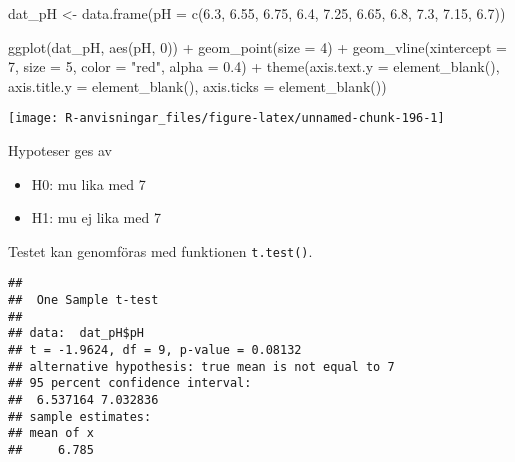 \documentclass[
]{book}
\newenvironment{Shaded}{\begin{snugshade}}{\end{snugshade}}
\newcommand{\AttributeTok}[1]{\textcolor[rgb]{0.77,0.63,0.00}{#1}}
\newcommand{\DecValTok}[1]{\textcolor[rgb]{0.00,0.00,0.81}{#1}}
\newcommand{\FloatTok}[1]{\textcolor[rgb]{0.00,0.00,0.81}{#1}}
\newcommand{\FunctionTok}[1]{\textcolor[rgb]{0.00,0.00,0.00}{#1}}
\newcommand{\NormalTok}[1]{#1}
\newcommand{\OtherTok}[1]{\textcolor[rgb]{0.56,0.35,0.01}{#1}}
\newcommand{\SpecialCharTok}[1]{\textcolor[rgb]{0.00,0.00,0.00}{#1}}
\newcommand{\StringTok}[1]{\textcolor[rgb]{0.31,0.60,0.02}{#1}}
\providecommand{\tightlist}{%
  \setlength{\itemsep}{0pt}\setlength{\parskip}{0pt}}
\theoremstyle{definition}
\theoremstyle{definition}
\theoremstyle{definition}
\theoremstyle{definition}
\theoremstyle{remark}
\begin{document}
\begin{Shaded}
\begin{Highlighting}[]
\NormalTok{dat\_pH }\OtherTok{\textless{}{-}} \FunctionTok{data.frame}\NormalTok{(}\AttributeTok{pH =} \FunctionTok{c}\NormalTok{(}\FloatTok{6.3}\NormalTok{, }\FloatTok{6.55}\NormalTok{, }\FloatTok{6.75}\NormalTok{, }\FloatTok{6.4}\NormalTok{, }\FloatTok{7.25}\NormalTok{, }\FloatTok{6.65}\NormalTok{, }\FloatTok{6.8}\NormalTok{, }\FloatTok{7.3}\NormalTok{, }\FloatTok{7.15}\NormalTok{, }\FloatTok{6.7}\NormalTok{))}

\FunctionTok{ggplot}\NormalTok{(dat\_pH, }\FunctionTok{aes}\NormalTok{(pH, }\DecValTok{0}\NormalTok{)) }\SpecialCharTok{+}
  \FunctionTok{geom\_point}\NormalTok{(}\AttributeTok{size =} \DecValTok{4}\NormalTok{) }\SpecialCharTok{+}
  \FunctionTok{geom\_vline}\NormalTok{(}\AttributeTok{xintercept =} \DecValTok{7}\NormalTok{, }\AttributeTok{size =} \DecValTok{5}\NormalTok{, }\AttributeTok{color =} \StringTok{"red"}\NormalTok{, }\AttributeTok{alpha =} \FloatTok{0.4}\NormalTok{) }\SpecialCharTok{+}
  \FunctionTok{theme}\NormalTok{(}\AttributeTok{axis.text.y =} \FunctionTok{element\_blank}\NormalTok{(), }
        \AttributeTok{axis.title.y =} \FunctionTok{element\_blank}\NormalTok{(), }
        \AttributeTok{axis.ticks =} \FunctionTok{element\_blank}\NormalTok{())}
\end{Highlighting}
\end{Shaded}

\begin{center}\texttt{[image: R-anvisningar\_files/figure-latex/unnamed-chunk-196-1]} \end{center}

Hypoteser ges av

\begin{itemize}
\tightlist
\item
  H0: mu lika med 7
\item
  H1: mu ej lika med 7
\end{itemize}

Testet kan genomföras med funktionen \texttt{t.test()}.

\begin{Shaded}
\end{Shaded}

\begin{verbatim}
## 
##  One Sample t-test
## 
## data:  dat_pH$pH
## t = -1.9624, df = 9, p-value = 0.08132
## alternative hypothesis: true mean is not equal to 7
## 95 percent confidence interval:
##  6.537164 7.032836
## sample estimates:
## mean of x 
##     6.785
\end{verbatim}
\end{document}
